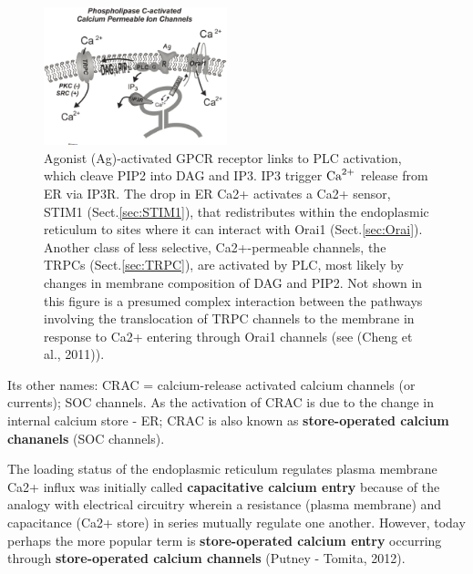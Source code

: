 \begin{figure}[hbt]
  \centerline{\includegraphics[height=4cm,
    angle=0]{./images/PLC-activated-Ca2+-influx.eps}}
  \caption{Agonist (Ag)-activated GPCR receptor links to PLC activation, which
  cleave PIP2 into DAG and IP3. IP3 trigger ${\text{Ca}^{2+}}$ release from ER via IP3R.
  The drop in ER Ca2+ activates a Ca2+ sensor, STIM1 (Sect.\ref{sec:STIM1}),
  that redistributes within the endoplasmic reticulum to sites where it can
  interact with Orai1 (Sect.\ref{sec:Orai}). Another class of less selective,
  Ca2+-permeable channels, the
TRPCs (Sect.\ref{sec:TRPC}), are activated by PLC, most likely by changes in
membrane composition of DAG and PIP2. Not shown in this figure is a presumed complex interaction between the
pathways involving the translocation of TRPC channels to the membrane in response to
Ca2+ entering through Orai1 channels (see (Cheng et al., 2011)).}
  \label{fig:PLC-activated-Ca2+-influx}
\end{figure}


Its other names: CRAC = calcium-release activated calcium channels (or
currents); SOC channels. As the activation of CRAC is due to the change in
internal calcium store - ER; CRAC is also known as {\bf store-operated calcium
chananels} (SOC channels).


The loading status of the endoplasmic reticulum regulates plasma membrane Ca2+
influx was initially called {\bf capacitative calcium entry} because of the
analogy with electrical circuitry wherein a resistance (plasma membrane) and
capacitance (Ca2+ store) in series mutually regulate one another.
However, today perhaps the more popular term is {\bf store-operated calcium
entry} occurring through {\bf store-operated calcium channels}
\citep{putney1999} (Putney - Tomita, 2012).



